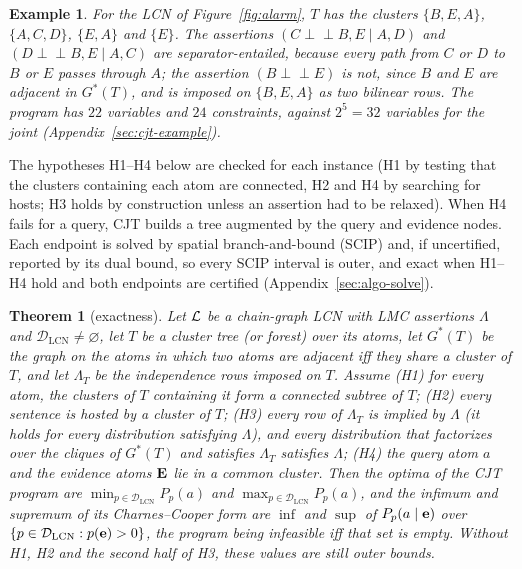 \documentclass{article} %
\newenvironment{revblock}{\color{blue}}{}
\newtheorem{theorem}{Theorem}
\newtheorem{example}{Example}
\newcommand{\indep}{\perp\!\!\!\perp}
\newcommand{\DLCN}{\mathcal{D}_{\mathrm{LCN}}}
\begin{document}
\begin{revblock}
\begin{example}
For the LCN of Figure~\ref{fig:alarm}, $T$ has the clusters $\{B,E,A\}$,
$\{A,C,D\}$, $\{E,A\}$ and $\{E\}$. The assertions $(C\indep B,E\mid A,D)$ and
$(D\indep B,E\mid A,C)$ are separator-entailed, because every path from $C$ or $D$
to $B$ or $E$ passes through $A$; the assertion $(B\indep E)$ is not, since $B$ and
$E$ are adjacent in $G^\ast(T)$, and is imposed on $\{B,E,A\}$ as two bilinear
rows. The program has $22$ variables and $24$ constraints, against $2^5=32$
variables for the joint (Appendix~\ref{sec:cjt-example}).
\end{example}

The hypotheses H1--H4 below are checked for each instance (H1 by testing that the clusters containing each atom are connected, H2 and H4 by searching for hosts; H3 holds by construction unless an assertion had to be relaxed). When H4 fails for a query, CJT builds a tree augmented by the query and evidence nodes. Each endpoint is solved by spatial branch-and-bound (SCIP) and, if uncertified, reported by its dual bound, so every SCIP interval is outer, and exact when H1--H4 hold and both endpoints are certified (Appendix~\ref{sec:algo-solve}).

\begin{theorem}[exactness]\label{thm:cjt}
Let $\mathcal{L}$ be a chain-graph LCN with LMC assertions $\Lambda$ and
$\DLCN\neq\varnothing$, let $T$ be a cluster tree (or forest) over its atoms, let
$G^\ast(T)$ be the graph on the atoms in which two atoms are adjacent iff they
share a cluster of $T$, and let $\Lambda_T$ be the independence rows imposed on
$T$. Assume \textup{(H1)} for every atom, the clusters of $T$ containing it form
a connected subtree of $T$; \textup{(H2)} every sentence is hosted by a cluster
of $T$; \textup{(H3)} every row of $\Lambda_T$ is implied by $\Lambda$ (it holds
for every distribution satisfying $\Lambda$), and every distribution that
factorizes over the cliques of $G^\ast(T)$ and satisfies $\Lambda_T$ satisfies
$\Lambda$; \textup{(H4)} the query atom $a$ and the evidence atoms $\mathbf{E}$ lie in a
common cluster. Then the optima of the CJT program are $\min_{p\in\DLCN}P_p(a)$
and $\max_{p\in\DLCN}P_p(a)$, and the infimum and supremum of its
Charnes--Cooper form are $\inf$ and $\sup$ of $P_p(a\mid\mathbf{e})$ over
$\{p\in\DLCN:p(\be)>0\}$, the program being infeasible iff that set is empty.
Without H1, H2 and the second half of H3, these values are still outer bounds.
\end{theorem}


\end{revblock}
\end{document}
